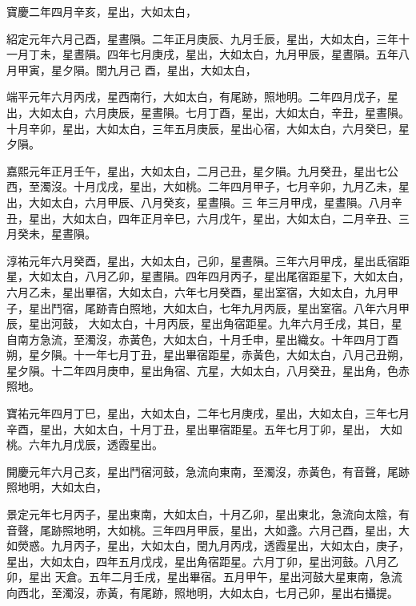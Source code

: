 \begin{pinyinscope}
 寶慶二年四月辛亥，星出，大如太白，



 紹定元年六月己酉，星晝隕。二年正月庚辰、九月壬辰，星出，大如太白，三年十一月丁未，星晝隕。四年七月庚戌，星出，大如太白，九月甲辰，星晝隕。五年八月甲寅，星夕隕。閏九月己
 酉，星出，大如太白，



 端平元年六月丙戌，星西南行，大如太白，有尾跡，照地明。二年四月戊子，星出，大如太白，六月庚辰，星晝隕。七月丁酉，星出，大如太白，辛丑，星晝隕。十月辛卯，星出，大如太白，三年五月庚辰，星出心宿，大如太白，六月癸巳，星夕隕。



 嘉熙元年正月壬午，星出，大如太白，二月己丑，星夕隕。九月癸丑，星出七公西，至濁沒。十月戊戌，星出，大如桃。二年四月甲子，七月辛卯，九月乙未，星出，大如太白，六月甲辰、八月癸亥，星晝隕。三
 年三月甲戌，星晝隕。八月辛丑，星出，大如太白，四年正月辛巳，六月戊午，星出，大如太白，二月辛丑、三月癸未，星晝隕。



 淳祐元年六月癸酉，星出，大如太白，己卯，星晝隕。三年六月甲戌，星出氐宿距星，大如太白，八月乙卯，星晝隕。四年四月丙子，星出尾宿距星下，大如太白，六月乙未，星出畢宿，大如太白，六年七月癸酉，星出室宿，大如太白，九月甲子，星出鬥宿，尾跡青白照地，大如太白，七年九月丙辰，星出室宿。八年六月甲辰，星出河鼓，
 大如太白，十月丙辰，星出角宿距星。九年六月壬戌，其日，星自南方急流，至濁沒，赤黃色，大如太白，十月壬申，星出織女。十年四月丁酉朔，星夕隕。十一年七月丁丑，星出畢宿距星，赤黃色，大如太白，八月己丑朔，星夕隕。十二年四月庚申，星出角宿、亢星，大如太白，八月癸丑，星出角，色赤照地。



 寶祐元年四月丁巳，星出，大如太白，二年七月庚戌，星出，大如太白，三年七月辛酉，星出，大如太白，十月丁丑，星出畢宿距星。五年七月丁卯，星出，
 大如桃。六年九月戊辰，透霞星出。



 開慶元年六月己亥，星出鬥宿河鼓，急流向東南，至濁沒，赤黃色，有音聲，尾跡照地明，大如太白，



 景定元年七月丙子，星出東南，大如太白，十月乙卯，星出東北，急流向太陰，有音聲，尾跡照地明，大如桃。三年四月甲辰，星出，大如盞。六月己酉，星出，大如熒惑。九月丙子，星出，大如太白，閏九月丙戌，透霞星出，大如太白，庚子，星出，大如太白，四年五月戊戌，星出角宿距星。六月丁卯，星出河鼓。八月乙卯，星出
 天倉。五年二月壬戌，星出畢宿。五月甲午，星出河鼓大星東南，急流向西北，至濁沒，赤黃，有尾跡，照地明，大如太白，七月己卯，星出右攝提。




\end{pinyinscope}
